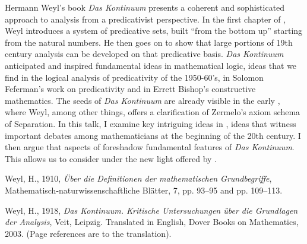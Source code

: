 \documentclass[bsl,meeting]{asl}
\newcommand{\NP}{}
\begin{document}
\thispagestyle{empty}


\NP  
{}
Hermann Weyl’s book \textit{Das Kontinuum} \cite{Weyl18} presents a coherent and sophisticated approach to analysis from a predicativist perspective. In the first chapter of \cite{Weyl18}, Weyl introduces a system of predicative sets, built ``from the bottom up'' starting  from the natural numbers. He then goes on to show that large portions of 19th century analysis can be developed on that predicative basis. 
\textit{Das Kontinuum} anticipated and inspired fundamental ideas in mathematical logic, ideas that we find in the logical analysis of predicativity of the 1950-60's, in Solomon Feferman’s work on predicativity and in Errett Bishop’s constructive mathematics. The seeds of \textit{Das Kontinuum} are already visible in the early \cite{Weyl10}, where Weyl, among other things, offers a clarification of Zermelo’s axiom schema of Separation. In this talk, I examine key intriguing ideas in \cite{Weyl10}, ideas that witness important debates among mathematicians at the beginning of the 20th century. I then argue that aspects of \cite{Weyl10} foreshadow fundamental features of \textit{Das Kontinuum}. This allows us to consider \cite{Weyl18} under the new light offered by \cite{Weyl10}.


\begin{thebibliography}{10}


Weyl, H., 1910,
{\em \"Uber die Definitionen der mathematischen Grundbegriffe}, Mathematisch-naturwissenschaftliche Bl\"atter, 
	7, pp. 93--95 and pp. 109--113.

Weyl, H., 1918, {\em Das {K}ontinuum.
  {K}ritische {U}ntersuchungen \"uber die {G}rundlagen der {A}nalysis}, Veit,
  Leipzig.
\newblock Translated in English, Dover Books on Mathematics, 2003. (Page
  references are to the translation).
  
  


\end{thebibliography}


\vspace*{-0.5\baselineskip}
\end{document}
